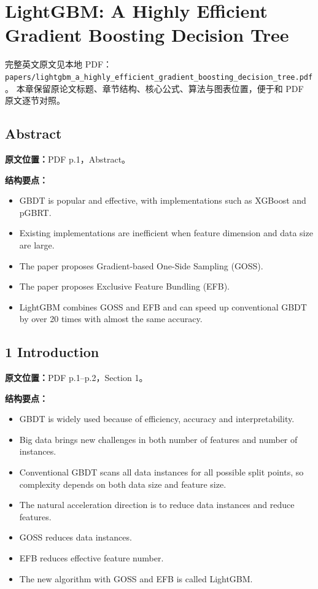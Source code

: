 \chapter{LightGBM: A Highly Efficient Gradient Boosting Decision Tree}

\begin{note}
完整英文原文见本地 PDF：
\texttt{papers/lightgbm\_a\_highly\_efficient\_gradient\_boosting\_decision\_tree.pdf}。
本章保留原论文标题、章节结构、核心公式、算法与图表位置，便于和 PDF 原文逐节对照。
\end{note}

\section{Abstract}

\textbf{原文位置：}PDF p.1，Abstract。

\textbf{结构要点：}
\begin{itemize}
  \item GBDT is popular and effective, with implementations such as XGBoost and pGBRT.
  \item Existing implementations are inefficient when feature dimension and data size are large.
  \item The paper proposes Gradient-based One-Side Sampling (GOSS).
  \item The paper proposes Exclusive Feature Bundling (EFB).
  \item LightGBM combines GOSS and EFB and can speed up conventional GBDT by over 20 times with almost the same accuracy.
\end{itemize}

\section{1 Introduction}

\textbf{原文位置：}PDF p.1--p.2，Section 1。

\textbf{结构要点：}
\begin{itemize}
  \item GBDT is widely used because of efficiency, accuracy and interpretability.
  \item Big data brings new challenges in both number of features and number of instances.
  \item Conventional GBDT scans all data instances for all possible split points, so complexity depends on both data size and feature size.
  \item The natural acceleration direction is to reduce data instances and reduce features.
  \item GOSS reduces data instances.
  \item EFB reduces effective feature number.
  \item The new algorithm with GOSS and EFB is called LightGBM.
\end{itemize}

